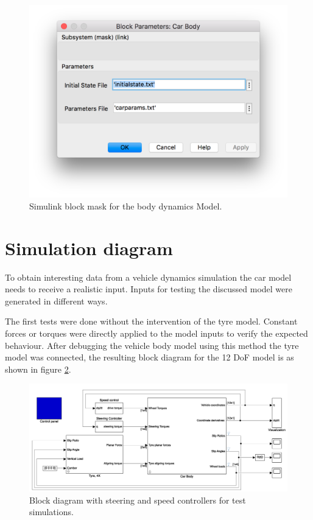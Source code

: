 \begin{figure}[ht]
    \centering
    \includegraphics[width=\textwidth]{images/bodymask.png}
    \caption{Simulink block mask for the body dynamics Model.}
	\label{12mask}
\end{figure}

\section{Simulation diagram}
To obtain interesting data from a vehicle dynamics simulation the car model needs to receive a realistic input. Inputs for testing the discussed model were generated in different ways.

The first tests were done without the intervention of the tyre model. Constant forces or torques were directly applied to the model inputs to verify the expected behaviour.
After debugging the vehicle body model using this method the tyre model was connected, the resulting block diagram for the 12 DoF model is as shown in figure \ref{12doftest}.

\begin{figure}
    \centering
    \includegraphics[width=\textwidth]{images/12doftest.png}
    \caption{Block diagram with steering and speed controllers for test simulations.}
    \label{12doftest}
\end{figure}

